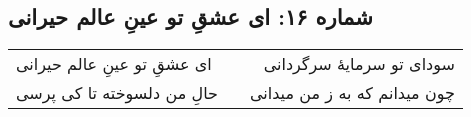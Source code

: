 \begin{center}
\section*{شماره ۱۶: ای عشقِ تو عینِ عالم حیرانی}
\label{sec:016}
\begin{longtable}{l p{0.5cm} r}
ای عشقِ تو عینِ عالم حیرانی
&&
سودای تو سرمایهٔ سرگردانی
\\
حالِ من دلسوخته تا کی پرسی
&&
چون میدانم که به ز من میدانی
\\
\end{longtable}
\end{center}
